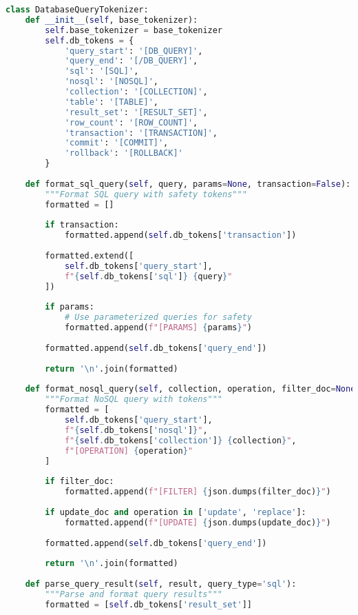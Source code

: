 \begin{lstlisting}[language=Python, caption=Database query tokens]
class DatabaseQueryTokenizer:
    def __init__(self, base_tokenizer):
        self.base_tokenizer = base_tokenizer
        self.db_tokens = {
            'query_start': '[DB_QUERY]',
            'query_end': '[/DB_QUERY]',
            'sql': '[SQL]',
            'nosql': '[NOSQL]',
            'collection': '[COLLECTION]',
            'table': '[TABLE]',
            'result_set': '[RESULT_SET]',
            'row_count': '[ROW_COUNT]',
            'transaction': '[TRANSACTION]',
            'commit': '[COMMIT]',
            'rollback': '[ROLLBACK]'
        }
        
    def format_sql_query(self, query, params=None, transaction=False):
        """Format SQL query with safety tokens"""
        formatted = []
        
        if transaction:
            formatted.append(self.db_tokens['transaction'])
        
        formatted.extend([
            self.db_tokens['query_start'],
            f"{self.db_tokens['sql']} {query}"
        ])
        
        if params:
            # Use parameterized queries for safety
            formatted.append(f"[PARAMS] {params}")
        
        formatted.append(self.db_tokens['query_end'])
        
        return '\n'.join(formatted)
    
    def format_nosql_query(self, collection, operation, filter_doc=None, update_doc=None):
        """Format NoSQL query with tokens"""
        formatted = [
            self.db_tokens['query_start'],
            f"{self.db_tokens['nosql']}",
            f"{self.db_tokens['collection']} {collection}",
            f"[OPERATION] {operation}"
        ]
        
        if filter_doc:
            formatted.append(f"[FILTER] {json.dumps(filter_doc)}")
        
        if update_doc and operation in ['update', 'replace']:
            formatted.append(f"[UPDATE] {json.dumps(update_doc)}")
        
        formatted.append(self.db_tokens['query_end'])
        
        return '\n'.join(formatted)
    
    def parse_query_result(self, result, query_type='sql'):
        """Parse and format query results"""
        formatted = [self.db_tokens['result_set']]
        

\end{lstlisting}
